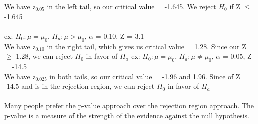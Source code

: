 \documentclass[12pt, a4paper]{article}
\begin{document}
		We have z$_{0.05}$ in the left tail, so our critical value = -1.645. We reject $H_0$ if Z $\leq$ -1.645 \\~\\
		ex: $H_0 : \mu = \mu_0$, $H_a: \mu > \mu_0$, $\alpha$ = 0.10, Z = 3.1 \\
		We  have z$_{0.10}$ in the right tail, which gives us critical value = 1.28. Since our Z $\geq$ 1.28, we can reject $H_0$ in favor of $H_a$ \newpage
		\noindent ex: $H_0 : \mu = \mu_0$, $H_a: \mu \neq \mu_0$, $\alpha$ = 0.05, Z = -14.5 \\
		We have z$_{0.025}$ in both tails, so our critical value = -1.96 and 1.96. Since of Z = -14.5 and is in the rejection region, we can reject $H_0$ in favor of $H_a$ \\~\\
		Many people prefer the p-value approach over the rejection region approach. The p-value is a measure of the strength of the evidence against the null hypothesis. \\~\\
		
\end{document}
